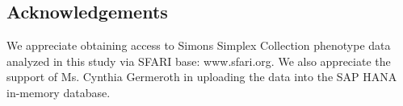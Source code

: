 \documentclass{bmcart}
\begin{document}
\begin{backmatter}
\section*{Acknowledgements}
  We appreciate obtaining access to Simons Simplex Collection phenotype data analyzed in this study via SFARI base: www.sfari.org. We also appreciate the support of Ms. Cynthia Germeroth in uploading the data into the SAP HANA in-memory database.








\end{backmatter}
\end{document}
